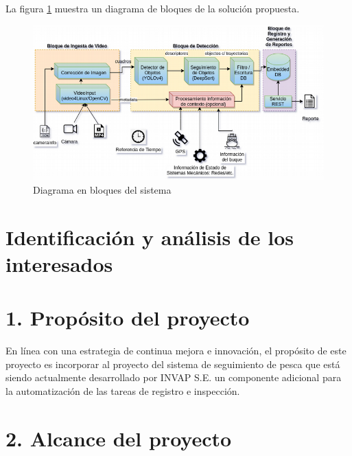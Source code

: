 \documentclass[11pt]{charter}
\begin{document}
La figura  \ref{fig:diagrama_bloques} muestra un diagrama de bloques de la solución propuesta.

\vspace{25px}

\begin{figure}[htpb]
\centering 
\includegraphics[width=.7\textwidth]{./Figuras/diagrama_bloques.png}
\caption{Diagrama en bloques del sistema}
\label{fig:diagrama_bloques}
\end{figure}

\vspace{25px}

\section{Identificación y análisis de los interesados}
\label{sec:interesados}

\section{1. Propósito del proyecto}
\label{sec:proposito}

En línea con una estrategia de continua mejora e innovación, el propósito de este proyecto es incorporar al proyecto del sistema de seguimiento de pesca que está siendo actualmente desarrollado por INVAP S.E. un componente adicional para la automatización de las tareas de registro e inspección. 

\section{2. Alcance del proyecto}
\label{sec:alcance}
\end{document}
